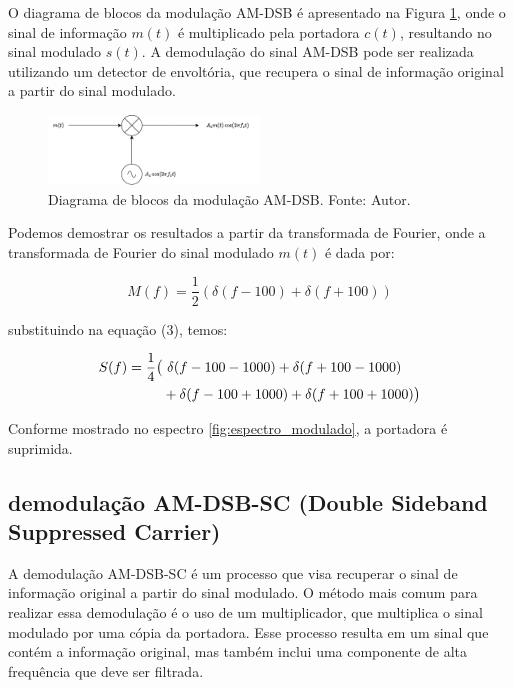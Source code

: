 O diagrama de blocos da modulação AM-DSB é apresentado na Figura \ref{fig:modulacao_am}, onde o sinal de informação $m(t)$ é multiplicado pela portadora $c(t)$, resultando no sinal modulado $s(t)$. A demodulação do sinal AM-DSB pode ser realizada utilizando um detector de envoltória, que recupera o sinal de informação original a partir do sinal modulado.

\begin{figure}[h]
    \centering
    \includegraphics[width=0.5\textwidth]{images/modulacao_am.png}
    \caption{Diagrama de blocos da modulação AM-DSB. Fonte: Autor.}
    \label{fig:modulacao_am}
\end{figure}


Podemos demostrar os resultados a partir da transformada de Fourier, onde a transformada de Fourier do sinal modulado $m(t)$ é dada por:

\begin{equation}
    M(f) = \frac{1}{2} \left( \delta (f - 100) + \delta (f + 100) \right)
\end{equation}

substituindo na equação (3), temos:

\begin{align}
    S(f) = \frac{1}{4} \big(
        &\ \delta (f - 100 - 1000) + \delta (f + 100 - 1000) \notag \\
        &+ \delta (f - 100 + 1000) + \delta (f + 100 + 1000)
    \big)
\end{align}

Conforme mostrado no espectro \ref{fig:espectro_modulado}, a portadora é suprimida.


\subsection{demodulação AM-DSB-SC (Double Sideband Suppressed Carrier)}

A demodulação AM-DSB-SC é um processo que visa recuperar o sinal de informação original a partir do sinal modulado. O método mais comum para realizar essa demodulação é o uso de um multiplicador, que multiplica o sinal modulado por uma cópia da portadora. Esse processo resulta em um sinal que contém a informação original, mas também inclui uma componente de alta frequência que deve ser filtrada.


